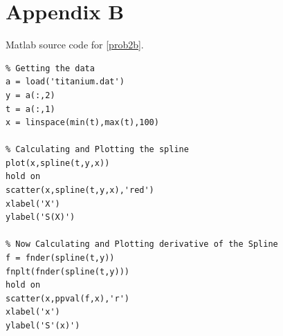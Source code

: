 \documentclass[a4paper,11pt]{article}
\begin{document}
\section{Appendix B}\label{code:problem2b}
Matlab source code for \ref{prob2b}.
{\footnotesize
\begin{lstlisting}
% Getting the data
a = load('titanium.dat')
y = a(:,2)
t = a(:,1)
x = linspace(min(t),max(t),100)

% Calculating and Plotting the spline
plot(x,spline(t,y,x))
hold on
scatter(x,spline(t,y,x),'red')
xlabel('X')
ylabel('S(X)')

% Now Calculating and Plotting derivative of the Spline
f = fnder(spline(t,y))
fnplt(fnder(spline(t,y)))
hold on
scatter(x,ppval(f,x),'r')
xlabel('x')
ylabel('S'(x)')
\end{lstlisting}
}
\end{document}
